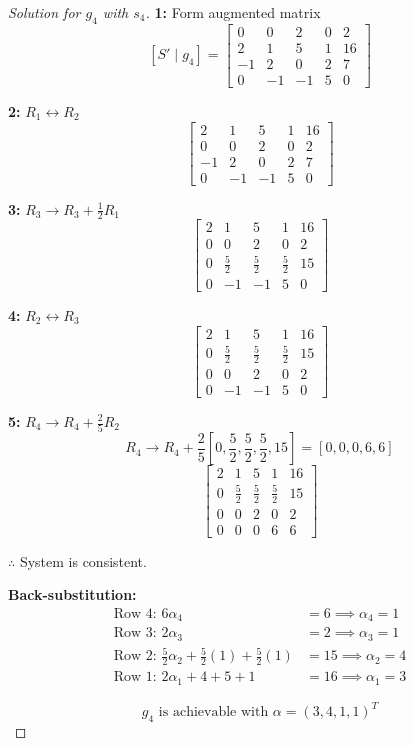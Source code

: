 \documentclass[12pt]{article}
\theoremstyle{definition}
\begin{document}
\begin{proof}[Solution for $g_4$ with $s_4$]

\textbf{1:} Form augmented matrix
\[
[S' \mid g_4] = \left[\begin{array}{cccc|c}
0 & 0 & 2 & 0 & 2 \\
2 & 1 & 5 & 1 & 16 \\
-1 & 2 & 0 & 2 & 7 \\
0 & -1 & -1 & 5 & 0
\end{array}\right]
\]

\textbf{2:} $R_1 \leftrightarrow R_2$
\[
\left[\begin{array}{cccc|c}
2 & 1 & 5 & 1 & 16 \\
0 & 0 & 2 & 0 & 2 \\
-1 & 2 & 0 & 2 & 7 \\
0 & -1 & -1 & 5 & 0
\end{array}\right]
\]

\textbf{3:} $R_3 \to R_3 + \frac{1}{2}R_1$
\[
\left[\begin{array}{cccc|c}
2 & 1 & 5 & 1 & 16 \\
0 & 0 & 2 & 0 & 2 \\
0 & \frac{5}{2} & \frac{5}{2} & \frac{5}{2} & 15 \\
0 & -1 & -1 & 5 & 0
\end{array}\right]
\]

\textbf{4:} $R_2 \leftrightarrow R_3$
\[
\left[\begin{array}{cccc|c}
2 & 1 & 5 & 1 & 16 \\
0 & \frac{5}{2} & \frac{5}{2} & \frac{5}{2} & 15 \\
0 & 0 & 2 & 0 & 2 \\
0 & -1 & -1 & 5 & 0
\end{array}\right]
\]

\textbf{5:} $R_4 \to R_4 + \frac{2}{5}R_2$
\[
R_4 \to R_4 + \frac{2}{5}\left[0, \frac{5}{2}, \frac{5}{2}, \frac{5}{2}, 15\right] = \left[0, 0, 0, 6, 6\right]
\]
\[
\left[\begin{array}{cccc|c}
2 & 1 & 5 & 1 & 16 \\
0 & \frac{5}{2} & \frac{5}{2} & \frac{5}{2} & 15 \\
0 & 0 & 2 & 0 & 2 \\
0 & 0 & 0 & 6 & 6
\end{array}\right]
\]

$\therefore$ System is consistent.

\textbf{Back-substitution:}
\begin{align*}
\text{Row 4: } 6\alpha_4 &= 6 \implies \alpha_4 = 1 \\
\text{Row 3: } 2\alpha_3 &= 2 \implies \alpha_3 = 1 \\
\text{Row 2: } \frac{5}{2}\alpha_2 + \frac{5}{2}(1) + \frac{5}{2}(1) &= 15 \implies \alpha_2 = 4 \\
\text{Row 1: } 2\alpha_1 + 4 + 5 + 1 &= 16 \implies \alpha_1 = 3
\end{align*}

\[
\boxed{g_4 \text{ is achievable with } \alpha = (3, 4, 1, 1)^T}
\]
\end{proof}
\end{document}
